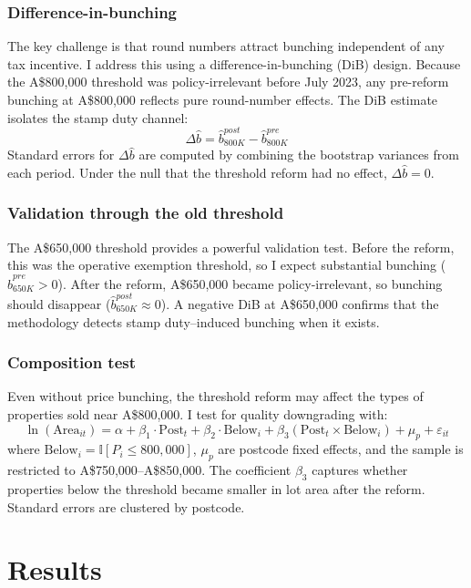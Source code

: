 \documentclass[12pt]{article}
\newcommand{\ind}{\mathbb{I}}
\begin{document}
\subsubsection*{Difference-in-bunching} The key challenge is that round numbers attract bunching independent of any tax incentive. I address this using a difference-in-bunching (DiB) design. Because the A\$800,000 threshold was policy-irrelevant before July 2023, any pre-reform bunching at A\$800,000 reflects pure round-number effects. The DiB estimate isolates the stamp duty channel:
\begin{equation}
  \Delta\hat{b} = \hat{b}^{post}_{800K} - \hat{b}^{pre}_{800K}
\end{equation}
Standard errors for $\Delta\hat{b}$ are computed by combining the bootstrap variances from each period. Under the null that the threshold reform had no effect, $\Delta\hat{b} = 0$.

\subsubsection*{Validation through the old threshold} The A\$650,000 threshold provides a powerful validation test. Before the reform, this was the operative exemption threshold, so I expect substantial bunching ($\hat{b}^{pre}_{650K} > 0$). After the reform, A\$650,000 became policy-irrelevant, so bunching should disappear ($\hat{b}^{post}_{650K} \approx 0$). A negative DiB at A\$650,000 confirms that the methodology detects stamp duty--induced bunching when it exists.

\subsubsection*{Composition test} Even without price bunching, the threshold reform may affect the types of properties sold near A\$800,000. I test for quality downgrading with:
\begin{equation}
  \ln(\text{Area}_{it}) = \alpha + \beta_1 \cdot \text{Post}_t + \beta_2 \cdot \text{Below}_i + \beta_3 (\text{Post}_t \times \text{Below}_i) + \mu_p + \varepsilon_{it}
\end{equation}
where $\text{Below}_i = \ind[P_i \leq 800{,}000]$, $\mu_p$ are postcode fixed effects, and the sample is restricted to A\$750,000--A\$850,000. The coefficient $\beta_3$ captures whether properties below the threshold became smaller in lot area after the reform. Standard errors are clustered by postcode.

\section{Results}
\label{sec:results}
\end{document}
